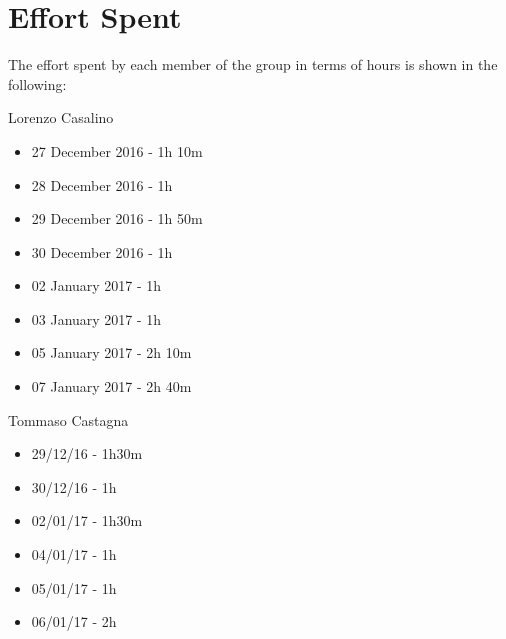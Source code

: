 \section{Effort Spent}

The effort spent by each member of the group in terms of hours is shown in the following:

Lorenzo Casalino

\begin{itemize}
	\item 27 December 2016 - 1h 10m
	\item 28 December 2016 - 1h
	\item 29 December 2016 - 1h 50m
	\item 30 December 2016 - 1h
	\item 02 January  2017 - 1h
	\item 03 January  2017 - 1h
	\item 05 January  2017 - 2h 10m
	\item 07 January  2017 - 2h 40m
\end{itemize}

Tommaso Castagna

\begin{itemize}
	\item 29/12/16 - 1h30m
	\item 30/12/16 - 1h
	\item 02/01/17 - 1h30m
	\item 04/01/17 - 1h
	\item 05/01/17 - 1h
	\item 06/01/17 - 2h
\end{itemize}

